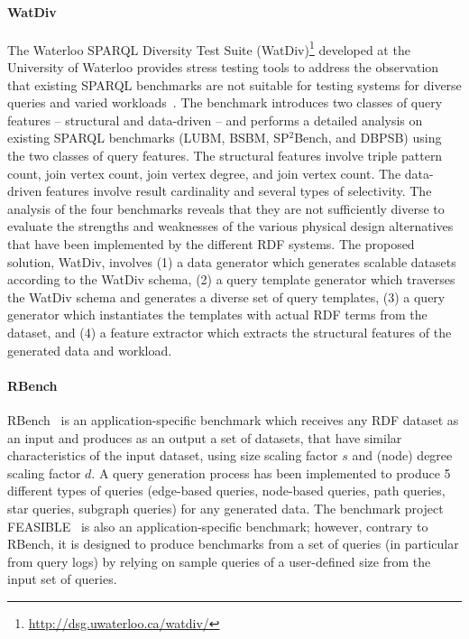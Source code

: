 \paragraph{WatDiv} The Waterloo SPARQL Diversity Test Suite (WatDiv)\footnote{\url{http://dsg.uwaterloo.ca/watdiv/}} developed at the University of Waterloo provides stress testing tools to address the observation that existing SPARQL benchmarks are not suitable for testing systems for diverse queries and varied workloads~\cite{Aluc:2014:DST:2717213.2717229}. The benchmark introduces two classes of query features -- structural and data-driven -- and performs a detailed analysis on existing SPARQL benchmarks (LUBM, BSBM, SP$^2$Bench, and DBPSB) using the two classes of query features. The structural features involve triple pattern count, join vertex count, join vertex degree, and join vertex count. The data-driven features involve result cardinality and several types of selectivity. The analysis of the four benchmarks reveals that they are not sufficiently diverse to evaluate the strengths and weaknesses of the various physical design alternatives that have been implemented by the different RDF systems. The proposed solution, WatDiv, involves (1) a data generator which generates scalable datasets according to the WatDiv schema, (2) a query template generator which traverses the WatDiv schema and generates a diverse set of query templates, (3) a query generator which instantiates the templates with actual RDF terms from the dataset, and (4) a feature extractor which extracts the structural features of the generated data and workload. %

\paragraph{RBench} RBench~\cite{Qiao:2015:RAR:2723372.2746479} is an application-specific benchmark which receives any RDF dataset as an input and produces as an output a set of datasets, that have similar characteristics of the input dataset, using size scaling factor $s$ and (node) degree scaling factor $d$. \iffalse A generated benchmark dataset is considered similar to the given dataset if their values for the dataset evaluation metrics and query evaluation times for different techniques are similar. Three evaluation metrics are utilized for this purpose: dataset coherence (i.e., a measure how uniformly predicates are distributed among the same type/class), relationship specialty (i.e., the number of occurrences of the same predicate associated with each resource), and literal diversity.\fi A query generation process has been implemented to produce 5 different types of queries (edge-based queries, node-based queries, path queries, star queries, subgraph queries) for any generated data. The benchmark project FEASIBLE~\cite{Saleem2015} is also an application-specific benchmark; however, contrary to RBench, it is designed to produce benchmarks from a set of queries (in particular from query logs) by relying on sample queries of a user-defined
size from the input set of queries.


